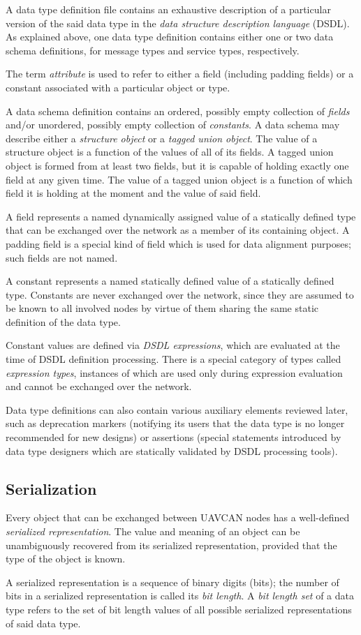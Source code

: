 A data type definition file contains an exhaustive description of a particular version of the said data type in the
\emph{data structure description language} (DSDL).
As explained above, one data type definition contains either one or two data schema definitions,
for message types and service types, respectively.

The term \emph{attribute} is used to refer to either a field (including padding fields) or a constant
associated with a particular object or type.

A data schema definition contains an ordered, possibly empty collection of \emph{fields} and/or
unordered, possibly empty collection of \emph{constants}.
A data schema may describe either a \emph{structure object} or a \emph{tagged union object}.
The value of a structure object is a function of the values of all of its fields.
A tagged union object is formed from at least two fields,
but it is capable of holding exactly one field at any given time.
The value of a tagged union object is a function of which field it is holding at the moment and the value of said field.

A field represents a named dynamically assigned value of a statically defined type
that can be exchanged over the network as a member of its containing object.
A padding field is a special kind of field which is used for data alignment purposes;
such fields are not named.

A constant represents a named statically defined value of a statically defined type.
Constants are never exchanged over the network, since they are assumed to be known to all involved nodes
by virtue of them sharing the same static definition of the data type.

Constant values are defined via \emph{DSDL expressions},
which are evaluated at the time of DSDL definition processing.
There is a special category of types called \emph{expression types},
instances of which are used only during expression evaluation
and cannot be exchanged over the network.

Data type definitions can also contain various auxiliary elements reviewed later,
such as deprecation markers (notifying its users that the data type is no longer recommended for new designs)
or assertions (special statements introduced by data type designers
which are statically validated by DSDL processing tools).

\subsection{Serialization}

Every object that can be exchanged between UAVCAN nodes has a well-defined \emph{serialized representation}.
The value and meaning of an object can be unambiguously recovered from its serialized representation,
provided that the type of the object is known.

\label{sec:dsdl_bit_length_set}
A serialized representation is a sequence of binary digits (bits);
the number of bits in a serialized representation is called its \emph{bit length}.
A \emph{bit length set} of a data type refers to the set of bit length values of all possible
serialized representations of said data type.
